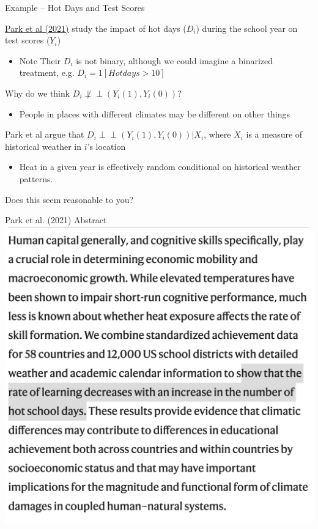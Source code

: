\documentclass[11pt,english,handout]{beamer}
\newenvironment{wideitemize}{\itemize\addtolength{\itemsep}{10pt}}{\enditemize}
\newcommand{\indep}{\perp\!\!\!\!\perp}
\begin{document}
\begin{frame}{Example -- Hot Days and Test Scores}
	
\begin{wideitemize}
\item
\href{https://www.nature.com/articles/s41562-020-00959-9}{\uline{Park et al (2021)}} study the impact of hot days ($D_i$) during the school year on test scores ($Y_i$)\smallskip
\begin{itemize}
	\item 
	Note Their $D_i$ is not binary, although we could imagine a binarized treatment, e.g. $D_i = 1[Hot days > 10]$
\end{itemize}

\item
Why do we think $D_i \not\indep (Y_i(1),Y_i(0))$? 
\pause
	\begin{itemize}
		\item 
		People in places with different climates may be different on other things
	\end{itemize}

\pause
\item
Park et al argue that $D_i \indep (Y_i(1),Y_i(0)) | X_i$, where $X_i$ is a measure of historical weather in $i$'s location 

	\begin{itemize}
		\item 
		Heat in a given year is effectively random conditional on historical weather patterns. 
	\end{itemize}

\item\pause{}
Does this seem reasonable to you? 

\end{wideitemize}	
	
\end{frame}


\begin{frame}{Park et al. (2021) Abstract}
	\centering
	\includegraphics[width =0.6\linewidth]{park-heat}
\end{frame}
\end{document}

